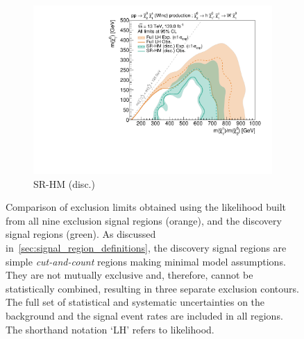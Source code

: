 \begin{figure}
\begin{subfigure}[b]{0.5\textwidth}
		\centering\includegraphics[width=\textwidth]{exclusion_1Lbb_SRHM_noLabel_v3}
		\caption{SR-HM (disc.)\label{fig:single_bin_SRHM}}
	\end{subfigure}%
	\caption{Comparison of exclusion limits obtained using the likelihood built from all nine exclusion signal regions (orange), and the discovery signal regions (green). As discussed in~\cref{sec:signal_region_definitions}, the discovery signal regions are simple \textit{cut-and-count} regions making minimal model assumptions. They are not mutually exclusive and, therefore, cannot be statistically combined, resulting in three separate exclusion contours. The full set of statistical and systematic uncertainties on the background and the signal event rates are included in all regions. The shorthand notation `LH' refers to likelihood.}\label{fig:single_bin}
\end{figure}

